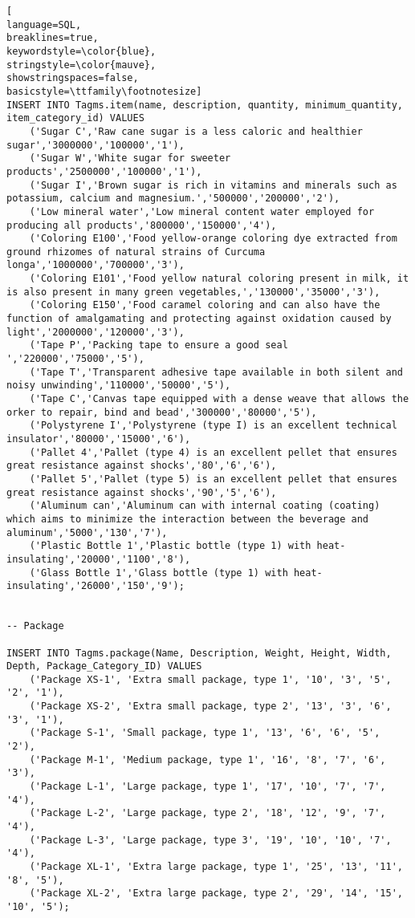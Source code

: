 \begin{lstlisting}[
language=SQL,
breaklines=true,
keywordstyle=\color{blue},
stringstyle=\color{mauve},
showstringspaces=false,
basicstyle=\ttfamily\footnotesize]
INSERT INTO Tagms.item(name, description, quantity, minimum_quantity, item_category_id) VALUES
    ('Sugar C','Raw cane sugar is a less caloric and healthier sugar','3000000','100000','1'),
    ('Sugar W','White sugar for sweeter products','2500000','100000','1'),
    ('Sugar I','Brown sugar is rich in vitamins and minerals such as potassium, calcium and magnesium.','500000','200000','2'),
    ('Low mineral water','Low mineral content water employed for producing all products','800000','150000','4'),
    ('Coloring E100','Food yellow-orange coloring dye extracted from ground rhizomes of natural strains of Curcuma longa','1000000','700000','3'),
    ('Coloring E101','Food yellow natural coloring present in milk, it is also present in many green vegetables,','130000','35000','3'),
    ('Coloring E150','Food caramel coloring and can also have the function of amalgamating and protecting against oxidation caused by light','2000000','120000','3'),
    ('Tape P','Packing tape to ensure a good seal ','220000','75000','5'),
    ('Tape T','Transparent adhesive tape available in both silent and noisy unwinding','110000','50000','5'),
    ('Tape C','Canvas tape equipped with a dense weave that allows the orker to repair, bind and bead','300000','80000','5'),
    ('Polystyrene I','Polystyrene (type I) is an excellent technical insulator','80000','15000','6'),
    ('Pallet 4','Pallet (type 4) is an excellent pellet that ensures great resistance against shocks','80','6','6'),
    ('Pallet 5','Pallet (type 5) is an excellent pellet that ensures great resistance against shocks','90','5','6'),
    ('Aluminum can','Aluminum can with internal coating (coating) which aims to minimize the interaction between the beverage and aluminum','5000','130','7'),
    ('Plastic Bottle 1','Plastic bottle (type 1) with heat-insulating','20000','1100','8'),
    ('Glass Bottle 1','Glass bottle (type 1) with heat-insulating','26000','150','9');


-- Package

INSERT INTO Tagms.package(Name, Description, Weight, Height, Width, Depth, Package_Category_ID) VALUES
    ('Package XS-1', 'Extra small package, type 1', '10', '3', '5', '2', '1'),
    ('Package XS-2', 'Extra small package, type 2', '13', '3', '6', '3', '1'),
    ('Package S-1', 'Small package, type 1', '13', '6', '6', '5', '2'),
    ('Package M-1', 'Medium package, type 1', '16', '8', '7', '6', '3'),
    ('Package L-1', 'Large package, type 1', '17', '10', '7', '7', '4'),
    ('Package L-2', 'Large package, type 2', '18', '12', '9', '7', '4'),
    ('Package L-3', 'Large package, type 3', '19', '10', '10', '7', '4'),
    ('Package XL-1', 'Extra large package, type 1', '25', '13', '11', '8', '5'),
    ('Package XL-2', 'Extra large package, type 2', '29', '14', '15', '10', '5');



\end{lstlisting}
